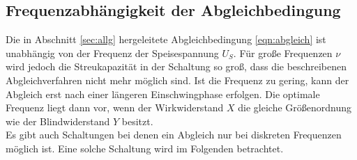 \subsection{Frequenzabhängigkeit der Abgleichbedingung}
\label{sec:frequenzabhängig}
Die in Abschnitt \ref{sec:allg} hergeleitete Abgleichbedingung \eqref{eqn:abgleich} ist unabhängig von der Frequenz der Speisespannung $U_S$.
Für große Frequenzen $\nu$ wird jedoch die Streukapazität in der Schaltung so groß, dass die beschreibenen Abgleichverfahren nicht mehr
möglich sind. Ist die Frequenz zu gering, kann der Abgleich erst nach einer längeren Einschwingphase erfolgen. Die optimale Frequenz liegt
dann vor, wenn der Wirkwiderstand $X$ die gleiche Größenordnung wie der Blindwiderstand $Y$ besitzt.
\\\noindent
Es gibt auch Schaltungen bei denen ein Abgleich nur bei diskreten Frequenzen möglich ist. Eine solche Schaltung wird im Folgenden
betrachtet.

